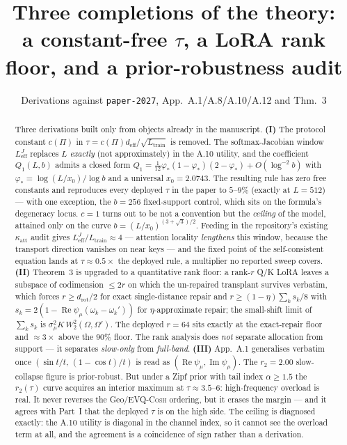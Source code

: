 \documentclass[11pt]{article}
\title{Three completions of the \evq{} theory:\\
a constant-free $\tau$, a LoRA rank floor, and a prior-robustness audit}
\author{Derivations against \texttt{paper-2027}, App.~A.1/A.8/A.10/A.12 and Thm.~3}
\date{}
\theoremstyle{definition}
\newcommand{\evq}{\textsc{EVQ-Cosh}}
\newcommand{\deff}{d_{\mathrm{eff}}}
\newcommand{\drot}{d_{\mathrm{rot}}}
\newcommand{\Ltr}{L_{\mathrm{train}}}
\newcommand{\Leff}{L_{\mathrm{eff}}^{J}}
\begin{document}
\maketitle

\begin{abstract}
\noindent Three derivations built only from objects already in the manuscript.
\textbf{(I)} The protocol constant $c(\Pi)$ in $\tau=c(\Pi)\deff/\sqrt{\Ltr}$ is removed.
The softmax-Jacobian window $\Leff$ replaces $L$ \emph{exactly} (not approximately) in the
A.10 utility, and the coefficient $Q_1(L,b)$ admits a closed form
$Q_1=\tfrac{1}{12}\varphi_*(1-\varphi_*)(2-\varphi_*)+O(\log^{-2}b)$
with $\varphi_*=\log(L/x_0)/\log b$ and a universal $x_0=2.0743$.
The resulting rule has zero free constants and reproduces every deployed $\tau$ in the paper to
$5$--$9\%$ (exactly at $L{=}512$) --- with one exception, the $b{=}256$ fixed-support control,
which sits on the formula's degeneracy locus. $c{=}1$ turns out to be not a convention but the
\emph{ceiling} of the model, attained only on the curve $b=(L/x_0)^{(3+\sqrt3)/2}$.
Feeding in the repository's existing $\kappa_{\mathrm{att}}$ audit gives $\Leff/\Ltr\approx4$ ---
attention locality \emph{lengthens} this window, because the transport direction vanishes on near
keys --- and the fixed point of the self-consistent equation lands at
$\tau\approx0.5\times$ the deployed rule, a multiplier no reported sweep covers.
\textbf{(II)} Theorem~3 is upgraded to a quantitative rank floor: a rank-$r$ Q/K LoRA
leaves a subspace of codimension $\le 2r$ on which the un-repaired transplant survives verbatim,
which forces $r\ge\drot/2$ for exact single-distance repair and
$r\ge(1-\eta)\sum_k s_k/8$ with $s_k=2(1-\operatorname{Re}\psi_\mu(\omega_k-\omega_k'))$
for $\eta$-approximate repair; the small-shift limit of $\sum_k s_k$ is
$\sigma_\mu^2 K\,W_2^2(\Omega,\Omega')$. The deployed $r{=}64$ sits exactly at the exact-repair
floor and $\approx3\times$ above the $90\%$ floor. The rank analysis does \emph{not} separate
allocation from support --- it separates \emph{slow-only} from \emph{full-band}.
\textbf{(III)} App.~A.1 generalises verbatim once $(\sin t/t,\,(1-\cos t)/t)$ is read as
$(\operatorname{Re}\psi_\mu,\operatorname{Im}\psi_\mu)$. The $r_2{=}2.00$ slow-collapse figure is
prior-robust. But under a Zipf prior with tail index $\alpha\ge1.5$ the $r_2(\tau)$ curve acquires
an interior maximum at $\tau\approx3.5$--$6$: high-frequency overload is real. It never reverses the
Geo/\evq{} ordering, but it erases the margin --- and it agrees with Part~I that the deployed
$\tau$ is on the high side. The ceiling is diagnosed exactly: the A.10 utility is diagonal in the
channel index, so it cannot see the overload term at all, and the agreement is a coincidence of
sign rather than a derivation.
\end{abstract}
\end{document}
